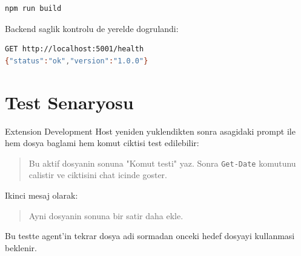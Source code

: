 \documentclass[12pt,a4paper]{article}
\begin{document}
\begin{lstlisting}[language=bash, caption={Derleme dogrulamasi}]
npm run build
\end{lstlisting}

Backend saglik kontrolu de yerelde dogrulandi:

\begin{lstlisting}[language=bash, caption={Backend health kontrolu}]
GET http://localhost:5001/health
{"status":"ok","version":"1.0.0"}
\end{lstlisting}

\section{Test Senaryosu}

Extension Development Host yeniden yuklendikten sonra asagidaki prompt ile hem dosya baglami hem komut ciktisi test edilebilir:

\begin{quote}
Bu aktif dosyanin sonuna "Komut testi" yaz. Sonra \texttt{Get-Date} komutunu calistir ve ciktisini chat icinde goster.
\end{quote}

Ikinci mesaj olarak:

\begin{quote}
Ayni dosyanin sonuna bir satir daha ekle.
\end{quote}

Bu testte agent'in tekrar dosya adi sormadan onceki hedef dosyayi kullanmasi beklenir.
\end{document}
